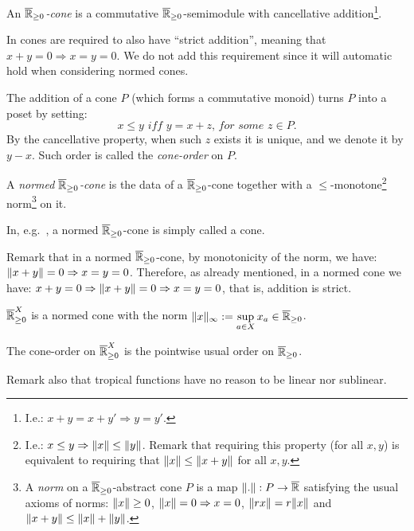 \begin{definition}
 An \emph{$\overline{\mathbb{R}}_{\geq 0}$-cone} is a commutative $\overline{\mathbb{R}}_{\geq 0}$-semimodule with cancellative addition\footnote{I.e.: $x+y=x+y' \Rightarrow y=y'$.}.
\end{definition}

In \cite{Selinger2004} cones are required to also have ``strict addition'', meaning that $x+y=0 \Rightarrow x=y=0$.
We do not add this requirement since it will automatic hold when considering normed cones.

\begin{remark}
 The addition of a cone $P$ (which forms a commutative monoid) turns $P$ into a poset by setting:
 \[
  x \leq y \textit{ iff } y=x+z \textit{, for some }z\in P.
 \]
 By the cancellative property, when such $z$ exists it is unique, and we denote it by $y-x$.
 Such order is called the \emph{cone-order} on $P$.
\end{remark}

\begin{definition}
 A \emph{normed $\overline{\mathbb{R}}_{\geq 0}$-cone} is the data of a $\overline{\mathbb{R}}_{\geq 0}$-cone together with a $\leq$-monotone\footnote{I.e.: $x\leq y \Rightarrow \lVert x\rVert\leq \lVert y\rVert$. Remark that requiring this property (for all $x,y$) is equivalent to requiring that $\lVert x\rVert\leq \lVert x+y\rVert$ for all $x,y$.} norm\footnote{A \emph{norm} on a $\overline{\mathbb{R}}_{\geq 0}$-abstract cone $P$ is a map $\lVert.\rVert:P\to \overline{\mathbb{R}}$ satisfying the usual axioms of norms:
 $\lVert x\rVert \geq 0$, $\lVert x\rVert = 0 \Rightarrow x=0$, $\lVert rx\rVert=r\lVert x\rVert$ and $\lVert x+y\rVert\leq \lVert x\rVert + \lVert y\rVert$.} on it.
\end{definition}

In, e.g.~\cite{EhrPagTas2018}, a normed $\overline{\mathbb{R}}_{\geq 0}$-cone is simply called a cone.

Remark that in a normed $\overline{\mathbb{R}}_{\geq 0}$-cone, by monotonicity of the norm, we have: $\lVert x+y\rVert=0 \Rightarrow x=y=0$.
Therefore, as already mentioned, in a normed cone we have: 
$x+y=0 \Rightarrow \lVert x+y\rVert=0 \Rightarrow x=y=0$, that is, addition is strict.

\begin{example}
 $\overline{\mathbb{R}}_{\geq 0}^X$ is a normed cone with the norm $\lVert x\rVert_\infty:=\sup\limits_{a\in X} x_a\in \overline{\mathbb{R}}_{\geq 0}$.
\end{example}

\begin{remark}
 The cone-order on $\overline{\mathbb{R}}_{\geq 0}^X$ is the pointwise usual order on $\overline{\mathbb{R}}_{\geq 0}$.
 
 Remark also that tropical functions have no reason to be linear nor sublinear.
\end{remark}

